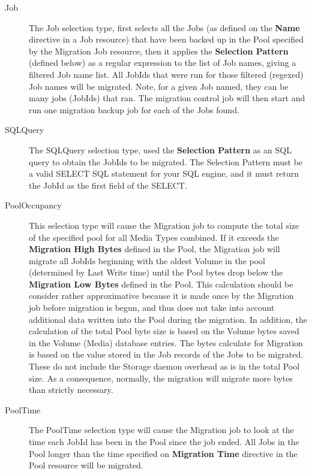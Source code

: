 \begin{description}
\begin{description}
  \item [Job] The Job selection type, first selects all the Jobs (as
        defined on the {\bf Name} directive in a Job resource)
        that have been backed up in the Pool specified by the Migration
        Job resource, then it applies the {\bf Selection Pattern} (defined
        below) as a regular expression to the list of Job names, giving
        a filtered Job name list.  All JobIds that were run for those
        filtered (regexed) Job names will be migrated.  Note, for a given
        Job named, they can be many jobs (JobIds) that ran.
        The migration control job will then start and run one migration
        backup job for each of the Jobs found.

  \item [SQLQuery] The SQLQuery selection type, used the {\bf Selection
        Pattern} as an SQL query to obtain the JobIds to be migrated.
        The Selection Pattern must be a valid SELECT SQL statement for your
        SQL engine, and it must return the JobId as the first field
        of the SELECT.

  \item [PoolOccupancy] This selection type will cause the Migration job
        to compute the total size of the specified pool for all Media Types
        combined. If it exceeds the {\bf Migration High Bytes} defined in
        the Pool, the Migration job will migrate all JobIds beginning with
        the oldest Volume in the pool (determined by Last Write time) until
        the Pool bytes drop below the {\bf Migration Low Bytes} defined in the
        Pool. This calculation should be consider rather approximative because
        it is made once by the Migration job before migration is begun, and
        thus does not take into account additional data written into the Pool
        during the migration.  In addition, the calculation of the total Pool
        byte size is based on the Volume bytes saved in the Volume (Media) database
        entries. The bytes calculate for Migration is based on the value stored
        in the Job records of the Jobs to be migrated. These do not include the
        Storage daemon overhead as is in the total Pool size. As a consequence,
        normally, the migration will migrate more bytes than strictly necessary.

  \item [PoolTime] The PoolTime selection type will cause the Migration job to
        look at the time each JobId has been in the Pool since the job ended.
        All Jobs in the Pool longer than the time specified on {\bf Migration Time}
        directive in the Pool resource will be migrated.


\end{description}
\end{description}
